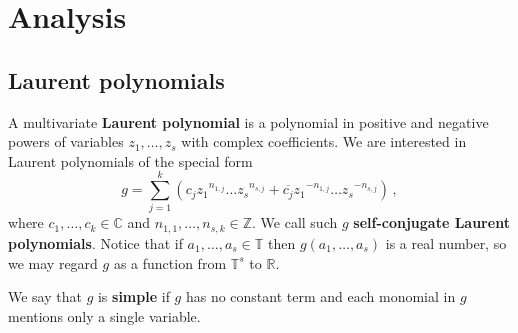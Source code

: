 \section{Analysis}

\subsection{Laurent polynomials}

A multivariate \textbf{Laurent polynomial} is a polynomial in positive
and negative powers of variables $z_1,\ldots,z_s$ with complex
coefficients.  We are interested in Laurent polynomials of the special form
\[ g = \sum_{j=1}^k \left( c_j {z_1}^{n_{1,j}}\ldots {z_s}^{n_{s,j}} +
    \overline{c_j} {z_1}^{-n_{1,j}}\ldots {z_s}^{-n_{s,j}} \right) \,
  ,\] where $c_1,\ldots,c_k \in \mathbb{C}$ and
$n_{1,1},\ldots,n_{s,k} \in \mathbb{Z}$.  We call such $g$
\textbf{self-conjugate Laurent polynomials}.  Notice that if
$a_1,\ldots,a_s \in \mathbb{T}$ then $g(a_1,\ldots,a_s)$ is a real
number, so we may regard $g$ as a function from $\mathbb{T}^s$ to
$\mathbb{R}$.

We say that $g$ is \textbf{simple} if $g$ has no constant term and
each monomial in $g$ mentions only a single variable.

